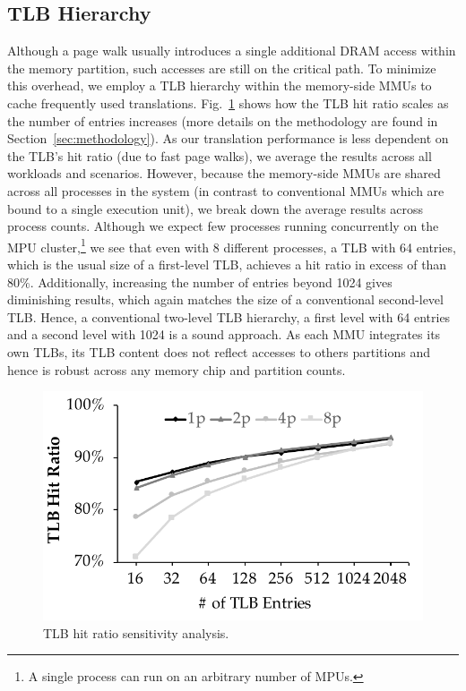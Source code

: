 \subsection{TLB Hierarchy}
\label{sec:tlb}

Although a page walk usually introduces a single additional DRAM access within the memory partition, such accesses are still on the critical path. To minimize this overhead, we employ a TLB hierarchy within the memory-side MMUs to cache frequently used translations. Fig.~\ref{fig:tlb_hitratio} shows how the TLB hit ratio scales as the number of entries increases (more details on the methodology are found in Section~\ref{sec:methodology}). As our translation performance is less dependent on the TLB's hit ratio (due to fast page walks), we average the results across all workloads and scenarios. However, because the memory-side MMUs are shared across all processes in the system (in contrast to conventional MMUs which are bound to a single execution unit), we break down the average results across process counts. Although we expect few processes running concurrently on the MPU cluster,\footnote{A single process can run on an arbitrary number of MPUs.} we see that even with 8 different processes, a TLB with 64 entries, which is the usual size of a first-level TLB, achieves a hit ratio in excess of than $80\%$. Additionally, increasing the number of entries beyond 1024 gives diminishing results, which again matches the size of a conventional second-level TLB. Hence, a conventional two-level TLB hierarchy, a first level with 64 entries and a second level with 1024 is a sound approach. As each MMU integrates its own TLBs, its TLB content does not reflect accesses to others partitions and hence is robust across any memory chip and partition counts.


\begin{figure}[t]
   \centering
   \includegraphics[width=0.8\columnwidth]{graphs/tlbmissratio.pdf}
   \caption{TLB hit ratio sensitivity analysis.}
   \label{fig:tlb_hitratio}
   
\end{figure}

